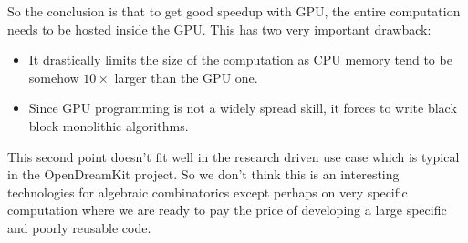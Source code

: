 \documentclass{deliverablereport}
\newcommand{\NN}{\mathbb{N}}
\begin{document}
So the conclusion is that to get good speedup with GPU, the entire computation
needs to be hosted inside the GPU. This has two very important drawback:
\begin{itemize}
\item It drastically limits the size of the computation as CPU memory tend to
  be somehow $10\times$ larger than the GPU one.
\item Since GPU programming is not a widely spread skill, it forces to write
  black block monolithic algorithms.
\end{itemize}
This second point doesn't fit well in the research driven use case which is
typical in the OpenDreamKit project. So we don't think this is an interesting
technologies for algebraic combinatorics except perhaps on very specific
computation where we are ready to pay the price of developing a large
specific and poorly reusable code.






\end{document}
